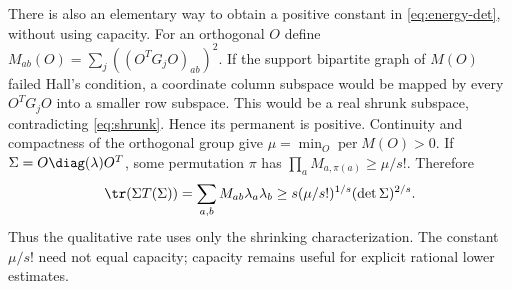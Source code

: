 There is also an elementary way to obtain a positive constant in
\eqref{eq:energy-det}, without using capacity. For an orthogonal $O$
define $M_{ab}(O)=\sum_j((O^TG_jO)_{ab})^2$. If the support bipartite
graph of $M(O)$ failed Hall's condition, a coordinate column subspace
would be mapped by every $O^TG_jO$ into a smaller row subspace.
This would be a real shrunk subspace, contradicting \eqref{eq:shrunk}.
Hence its permanent is positive. Continuity and compactness of the
orthogonal group give
$\mu=\min_O\operatorname{per}M(O)>0$.
If $\Sigma=O\diag(\lambda)O^T$, some permutation $\pi$ has
$\prod_aM_{a,\pi(a)}\ge\mu/s!$. Therefore
\[
 \tr(\Sigma T(\Sigma))
 =\sum_{a,b}M_{ab}\lambda_a\lambda_b
 \ge s(\mu/s!)^{1/s}(\det\Sigma)^{2/s}.
\]
Thus the qualitative rate uses only the shrinking characterization.
The constant $\mu/s!$ need not equal capacity; capacity remains useful
for explicit rational lower estimates.

